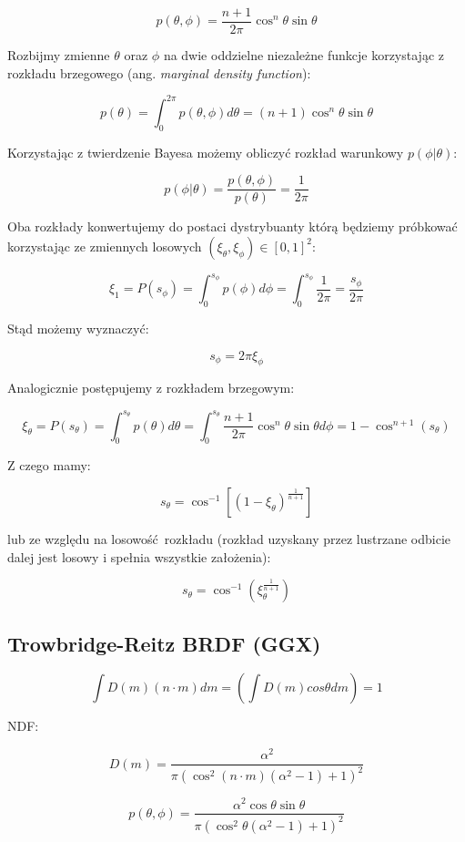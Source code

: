 \documentclass[../main.tex]{subfiles}
\begin{document}
\[
  p(\theta, \phi) =
    \frac{n+1}{2\pi} \cos^{n}\theta \sin\theta
\]

Rozbijmy zmienne $\theta$ oraz $\phi$ na dwie oddzielne niezależne funkcje
korzystając z rozkładu brzegowego (ang. \textit{marginal density function}):

\[
  p(\theta) = \int_{0}^{2\pi} {
    p(\theta, \phi) d \theta
  } =
  (n+1) \cos^{n}{\theta} \sin\theta
\]

Korzystając z twierdzenie Bayesa możemy obliczyć rozkład warunkowy
	$p(\phi | \theta)$:

\[
  p(\phi | \theta) = \frac{
    p(\theta, \phi)
	}{
		p(\theta)
	} = \frac{1}{2\pi}
\]

Oba rozkłady konwertujemy do postaci dystrybuanty którą będziemy próbkować
korzystając ze zmiennych losowych $(\xi_{\theta}, \xi_{\phi}) \in [0,1]^2$:

\[
	\xi_1 = P(s_{\phi}) =
	\int_{0}^{s_{\phi}} {
		p(\phi) d\phi
	} =
	\int_{0}^{s_{\phi}} {
		\frac{1}{2\pi}
	} =
	\frac{s_{\phi}}{2\pi}
\]

Stąd możemy wyznaczyć:

\[
	s_{\phi} = 2 \pi \xi_{\phi}
\]

Analogicznie postępujemy z rozkładem brzegowym:

\[
  \xi_{\theta} = P(s_{\theta}) =
	\int_{0}^{s_{\theta}} {
		p(\theta) d\theta
	} =
	\int_{0}^{s_{\theta}} {
		\frac{n+1}{2\pi} \cos^{n}\theta \sin\theta d\phi
	} =
	1 - \cos^{n+1}(s_{\theta})
\]

Z czego mamy:

\[
	s_{\theta} =
	\cos^{-1}\left[
		(1 - \xi_{\theta})^{\frac{1}{n+1}}
	\right]
\]

lub ze względu na losowość rozkładu (rozkład uzyskany przez lustrzane odbicie
dalej jest losowy i spełnia wszystkie założenia):

\[
	s_{\theta} =
	\cos^{-1}\left(
		\xi_{\theta}^{\frac{1}{n+1}}
	\right)
\]

\subsection{Trowbridge-Reitz BRDF (GGX)}

\[
  \int D(m) (n \cdot m) dm = \left(\int D(m) cos\theta dm\right) = 1
\]

NDF:

\[
	D(m) = \frac{
		\alpha^2
	}{
    \pi \left(
      \cos^{2}(n \cdot m)(\alpha^2 - 1) + 1
    \right)^{2}
  }
\]

\[
  p(\theta, \phi) =
	\frac{
    \alpha^2 \cos\theta \sin\theta
	}{
    \pi \left(
      \cos^{2}\theta (\alpha^2 - 1) + 1
    \right)^{2}
  }
\]
\end{document}
